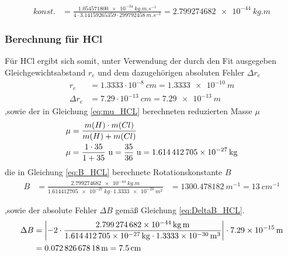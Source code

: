 \begin{align}
\label{eq:konst}
konst.&= 			 \frac{\SI[mode=math]{1.054571800e-34}{kg.m.s^{-1}}}{4\cdot 3.14159265359 \cdot \SI[mode=math]{299792458}{m.s^{-1}}}=\SI[mode=math]{2.799274682e-44}{kg.m}  				
\end{align}






\subsubsection*{Berechnung für HCl}
Für HCl ergibt sich somit, unter Verwendung der durch den Fit ausgegeben Gleichgewichtsabstand $r_e$ und dem dazugehörigen absoluten Fehler $\Delta r_e$
\begin{align}
\label{eq:re_HCL}
r_e &= 1.3333 \cdot 10^{-8} ~\si{cm}=\SI[mode=math]{1.3333e-10}{m}
\\
\Delta r_e &= 7.29 \cdot 10^{-13} ~\si{cm}=\SI[mode=math]{7.29e-13}{m}
\end{align}
,sowie der in Gleichung \ref{eq:mu_HCL} berechneten reduzierten Masse $\mu$
\begin{align}
\mu&= \frac{m(H)\cdot m(Cl)}{m(H)+m(Cl)}\notag\\
\mu&= \frac{1\cdot35}{1+35} ~\si{u}=\frac{35}{36}~\si{u}=\SI[mode=math]{1.614412705e-27}{kg}\label{eq:mu_HCL}
\end{align}
die in Gleichung \ref{eq:B_HCL} berechnete Rotationskonstante $B$
\begin{align}
\label{eq:B_HCL}
B &=\frac{\SI[mode=math]{2.799274682e-44}{kg.m}}{\SI[mode=math]{1.614412705e-27}{kg}\cdot\SI[mode=math]{1.3333e-20}{m^{2}}}
&=\SI[mode=math]{1300.478182}{m^{-1}}
=\SI[mode=math]{13}{cm^{-1}}
\end{align}


,sowie der absolute Fehler $\Delta B$  gemäß Gleichung  \ref{eq:DeltaB_HCL}.  
\begin{align}
\Delta B &= \left|-2\cdot \frac{\SI[mode=math]{2.799274682e-44}{kg.m}}{\SI[mode=math]{1.614412705e-27}{kg}\cdot\SI[mode=math]{1.3333e-30}{m^{3}}}\right| \cdot \SI[mode=math]{7.29e-15}{m}
\notag\\
&=  \SI[mode=math]{0.07282667818}{m}= \SI[mode=math]{7.5}{cm} \label{eq:DeltaB_HCL}
\end{align} 






